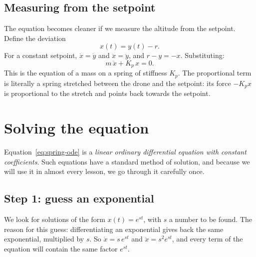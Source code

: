 \subsection{Measuring from the setpoint}
The equation becomes cleaner if we measure the altitude from the setpoint. Define the deviation
\begin{equation}
  x(t) = y(t) - r .
\end{equation}
For a constant setpoint, $\dot x = \dot y$ and $\ddot x = \ddot y$, and $r - y = -x$. Substituting:
\begin{equation}\label{eq:spring-ode}
  m\,\ddot x + K_p\,x = 0 .
\end{equation}
This is the equation of a mass on a spring of stiffness $K_p$. The proportional term is literally a spring stretched between the drone and the setpoint: its force $-K_p x$ is proportional to the stretch and points back towards the setpoint.

\section{Solving the equation}

Equation~\eqref{eq:spring-ode} is a \emph{linear ordinary differential equation with constant coefficients}. Such equations have a standard method of solution, and because we will use it in almost every lesson, we go through it carefully once.

\subsection{Step 1: guess an exponential}
We look for solutions of the form $x(t) = e^{st}$, with $s$ a number to be found. The reason for this guess: differentiating an exponential gives back the same exponential, multiplied by $s$. So $\dot x = s\,e^{st}$ and $\ddot x = s^2 e^{st}$, and every term of the equation will contain the same factor $e^{st}$.

